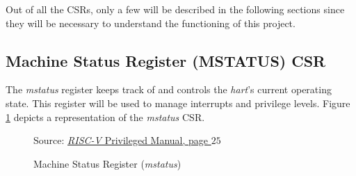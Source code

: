 Out of all the CSRs, only a few will be described in the following sections
since they will be necessary to understand the functioning of this project.

\subsection{Machine Status Register (MSTATUS) CSR}
\label{subsec:mstatus}

The \textit{mstatus} register keeps track of and controls the \textit{hart}'s current
operating state. This register will be used to manage interrupts and privilege
levels. Figure \ref{fig:mstatus} depicts a representation of the \textit{mstatus}
CSR. \\
\begin{figure}[H]
  \centering
  \def\stackalignment{r} %
  {\scriptsize Source: \href{https://drive.google.com/file/d/17GeetSnT5wW3xNuAHI95-SI1gPGd5sJ_/view}{\textit{RISC-V} Privileged Manual, page $25$}}
  \caption{Machine Status Register (\textit{mstatus})}
  \label{fig:mstatus}
\end{figure}


